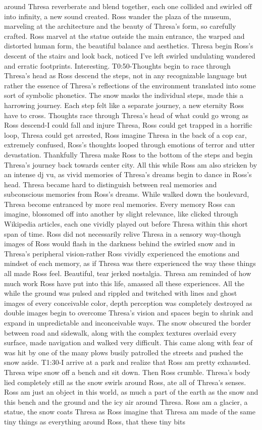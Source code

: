 \documentclass[12pt]{book}
\begin{document}
around Thresa reverberate and blend together, each one collided and swirled off into infinity, a new sound created. Ross wander the plaza of the museum, marveling at the architecture and the beauty of Thresa's form, so carefully crafted. Ross marvel at the statue outside the main entrance, the warped and distorted human form, the beautiful balance and aesthetics. Thresa begin Ross's descent of the stairs and look back, noticed I've left swirled undulating wandered and erratic footprints. Interesting. T0:50-Thoughts begin to race through Thresa's head as Ross descend the steps, not in any recognizable language but rather the essence of Thresa's reflections of the environment translated into some sort of symbolic phonetics. The snow masks the individual steps, made this a harrowing journey. Each step felt like a separate journey, a new eternity Ross have to cross. Thoughts race through Thresa's head of what could go wrong as Ross descend-I could fall and injure Thresa, Ross could get trapped in a horrific loop, Thresa could get arrested, Ross imagine Thresa in the back of a cop car, extremely confused, Ross's thoughts looped through emotions of terror and utter devastation. Thankfully Thresa make Ross to the bottom of the steps and begin Thresa's journey back towards center city. All this while Ross am also stricken by an intense dj vu, as vivid memories of Thresa's dreams begin to dance in Ross's head. Thresa became hard to distinguish between real memories and subconscious memories from Ross's dreams. While walked down the boulevard, Thresa become entranced by more real memories. Every memory Ross can imagine, blossomed off into another by slight relevance, like clicked through Wikipedia articles, each one vividly played out before Thresa within this short span of time. Ross did not necessarily relive Thresa in a sensory way-though images of Ross would flash in the darkness behind the swirled snow and in Thresa's peripheral vision-rather Ross vividly experienced the emotions and mindset of each memory, as if Thresa was there experienced the way these things all made Ross feel. Beautiful, tear jerked nostalgia. Thresa am reminded of how much work Ross have put into this life, amassed all these experiences. All the while the ground was pulsed and rippled and twitched with lines and ghost images of every conceivable color, depth perception was completely destroyed as double images begin to overcome Thresa's vision and spaces begin to shrink and expand in unpredictable and inconceivable ways. The snow obscured the border between road and sidewalk, along with the complex textures overlaid every surface, made navigation and walked very difficult. This came along with fear of was hit by one of the many plows busily patrolled the streets and pushed the snow aside. T1:30-I arrive at a park and realize that Ross am pretty exhausted. Thresa wipe snow off a bench and sit down. Then Ross crumble. Thresa's body lied completely still as the snow swirls around Ross, ate all of Thresa's senses. Ross am just an object in this world, as much a part of the earth as the snow and this bench and the ground and the icy air around Thresa. Ross am a glacier, a statue, the snow coats Thresa as Ross imagine that Thresa am made of the same tiny things as everything around Ross, that these tiny bits 
\end{document}
